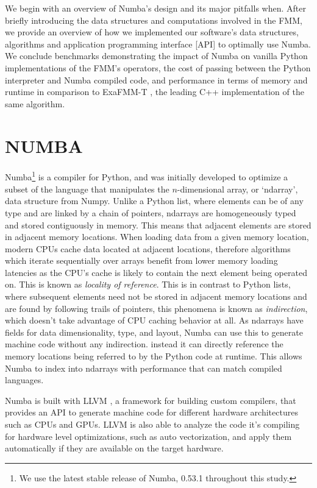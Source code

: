 \documentclass{IEEEcsmag}
\begin{document}
We begin with an overview of Numba's design and its major pitfalls when. After briefly introducing the data structures and computations involved in the FMM, we provide an overview of how we implemented our software's data structures, algorithms and application programming interface [API] to optimally use Numba. We conclude benchmarks demonstrating the impact of Numba on vanilla Python implementations of the FMM's operators, the cost of passing between the Python interpreter and Numba compiled code, and performance in terms of memory and runtime in comparison to ExaFMM-T \cite{Wang2021}, the leading C++ implementation of the same algorithm. 

\section{NUMBA}

Numba\footnote{We use the latest stable release of Numba, 0.53.1 throughout this study.} is a compiler for Python, and was initially developed to optimize a subset of the language that manipulates the $n$-dimensional array, or `ndarray', data structure from Numpy. Unlike a Python list, where elements can be of any type and are linked by a chain of pointers, ndarrays are homogeneously typed and stored contiguously in memory. This means that adjacent elements are stored in adjacent memory locations. When loading data from a given memory location, modern CPUs cache data located at adjacent locations, therefore algorithms which iterate sequentially over arrays benefit from lower memory loading latencies as the CPU's cache is likely to contain the next element being operated on. This is known as \textit{locality of reference}. This is in contrast to Python lists, where subsequent elements need not be stored in adjacent memory locations and are found by following trails of pointers, this phenomena is known as \textit{indirection}, which doesn't take advantage of CPU caching behavior at all. As ndarrays have fields for data dimensionality, type, and layout, Numba can use this to generate machine code without any indirection. instead it can directly reference the memory locations being referred to by the Python code at runtime. This allows Numba to index into ndarrays with performance that can match compiled languages.

Numba is built with LLVM \cite{Lattner2004}, a framework for building custom compilers, that provides an API to generate machine code for different hardware architectures such as CPUs and GPUs. LLVM is also able to analyze the code it's compiling for hardware level optimizations, such as auto vectorization, and apply them automatically if they are available on the target hardware.
\end{document}
